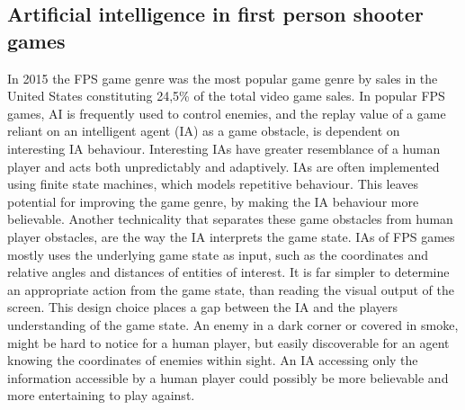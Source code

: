 \subsection{Artificial intelligence in first person shooter games}
In 2015 the FPS game genre was the most popular game genre by sales in the United States\cite{marketshare} constituting 24,5\% of the total video game sales. In popular FPS games, AI is frequently used to control enemies, and the replay value of a game reliant on an intelligent agent (IA) as a game obstacle, is dependent on interesting IA behaviour. Interesting IAs have greater resemblance of a human player and acts both unpredictably and adaptively. IAs are often implemented using finite state machines, which models repetitive behaviour. This leaves potential for improving the game genre, by making the IA behaviour more believable. Another technicality that separates these game obstacles from human player obstacles, are the way the IA interprets the game state. IAs of FPS games mostly uses the underlying game state as input, such as the coordinates and relative angles and distances of entities of interest. It is far simpler to determine an appropriate action from the game state, than reading the visual output of the screen. This design choice places a gap between the IA and the players understanding of the game state. An enemy in a dark corner or covered in smoke, might be hard to notice for a human player, but easily discoverable for an agent knowing the coordinates of enemies within sight. An IA accessing only the information accessible by a human player could possibly be more believable and more entertaining to play against. 

